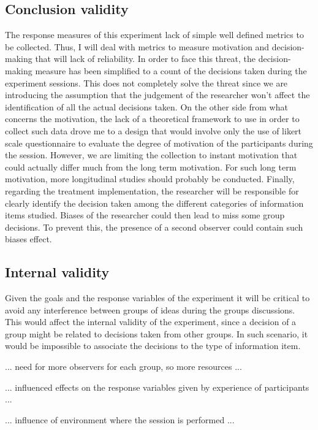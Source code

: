 \documentclass[runningheads]{llncs}
\begin{document}
\subsection{Conclusion validity}

The response measures of this experiment lack of simple well defined metrics to be collected. Thus, I will deal with metrics to measure motivation and decision-making that will lack of reliability. In order to face this threat, the decision-making measure has been simplified to a count of the decisions taken during the experiment sessions. This does not completely solve the threat since we are introducing the assumption that the judgement of the researcher won't affect the identification of all the actual decisions taken. On the other side from what concerns the motivation, the lack of a theoretical framework to use in order to collect such data drove me to a design that would involve only the use of likert scale questionnaire to evaluate the degree of motivation of the participants during the session. However, we are limiting the collection to instant motivation that could actually differ much from the long term motivation. For such long term motivation, more longitudinal studies should probably be conducted. Finally, regarding the treatment implementation, the researcher will be responsible for clearly identify the decision taken among the different categories of information items studied. Biases of the researcher could then lead to miss some group decisions. To prevent this, the presence of a second observer could contain such biases effect.

\subsection{Internal validity}

Given the goals and the response variables of the experiment it will be critical to avoid any interference between groups of ideas during the groups discussions. This would affect the internal validity of the experiment, since a decision of a group might be related to decisions taken from other groups. In such scenario, it would be impossible to associate the decisions to the type of information item.

... need for more observers for each group, so more resources ...

... influenced effects on the response variables given by experience of participants ...

... influence of environment where the session is performed ...
\end{document}
